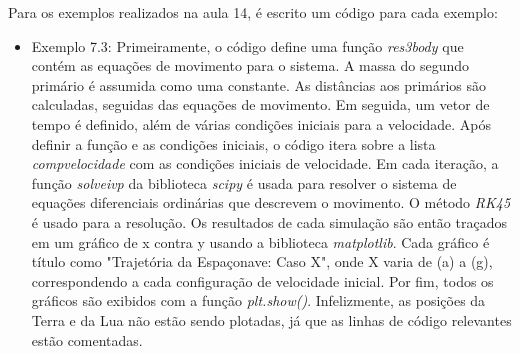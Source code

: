 Para os exemplos realizados na aula 14, é escrito um código para cada exemplo: 

\begin{itemize}
    \item Exemplo 7.3: Primeiramente, o código define uma função \textit{res3body} que contém as equações de movimento para o sistema. A massa do segundo primário é assumida como uma constante. As distâncias aos primários são calculadas, seguidas das equações de movimento. Em seguida, um vetor de tempo é definido, além de várias condições iniciais para a velocidade. Após definir a função e as condições iniciais, o código itera sobre a lista \textit{compvelocidade} com as condições iniciais de velocidade. Em cada iteração, a função \textit{solveivp} da biblioteca \textit{scipy} é usada para resolver o sistema de equações diferenciais ordinárias que descrevem o movimento. O método \textit{RK45} é usado para a resolução. Os resultados de cada simulação são então traçados em um gráfico de x contra y usando a biblioteca \textit{matplotlib}. Cada gráfico é título como "Trajetória da Espaçonave: Caso X", onde X varia de (a) a (g), correspondendo a cada configuração de velocidade inicial. Por fim, todos os gráficos são exibidos com a função \textit{plt.show()}. Infelizmente, as posições da Terra e da Lua não estão sendo plotadas, já que as linhas de código relevantes estão comentadas.
\end{itemize}

